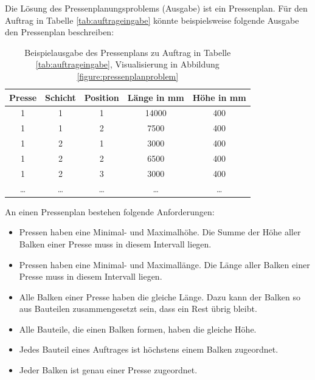 Die Lösung des Pressenplanungsproblems (Ausgabe) ist ein Pressenplan.
Für den Auftrag in Tabelle \ref{tab:auftrageingabe} könnte beispielsweise folgende Ausgabe den Pressenplan beschreiben:

\begin{table}[H]
    \centering
    \begin{tabular}{|c|c|c|c|c|}
        \hline
        \textbf{Presse} & \textbf{Schicht} & \textbf{Position} & \textbf{Länge in mm} & \textbf{Höhe in mm} \\
        \hline
        1 & 1 & 1 & 14000 & 400 \\
        1 & 1 & 2 & 7500 & 400 \\
        1 & 2 & 1 & 3000 & 400 \\
        1 & 2 & 2 & 6500 & 400 \\
        1 & 2 & 3 & 3000 & 400 \\
        \ldots & \ldots & \ldots & \ldots & \ldots \\
        \hline
    \end{tabular}
    \caption{Beispielausgabe des Pressenplans zu Auftrag in Tabelle \ref{tab:auftrageingabe}, Visualisierung in Abbildung \ref{figure:pressenplanproblem}}
    \label{tab:auftragausgabe}
\end{table}

An einen Pressenplan bestehen folgende Anforderungen:
\begin{itemize}
    \item Pressen haben eine Minimal- und Maximalhöhe. Die Summe der Höhe aller Balken einer Presse muss in diesem Intervall liegen.
    \item Pressen haben eine Minimal- und Maximallänge. Die Länge aller Balken einer Presse muss in diesem Intervall liegen.
    \item Alle Balken einer Presse haben die gleiche Länge. Dazu kann der Balken so aus Bauteilen zusammengesetzt sein, dass ein Rest übrig bleibt.
    \item Alle Bauteile, die einen Balken formen, haben die gleiche Höhe.
    \item Jedes Bauteil eines Auftrages ist höchstens einem Balken zugeordnet.
    \item Jeder Balken ist genau einer Presse zugeordnet.
\end{itemize}


